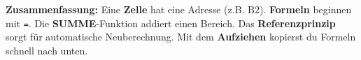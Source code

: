 \documentclass[11pt, a4paper]{article}
\begin{document}
\vspace{0.5em}


\begin{merkkasten}
\textbf{Zusammenfassung:} Eine \textbf{Zelle} hat eine Adresse (z.B. B2). \textbf{Formeln} beginnen mit \texttt{=}. Die \textbf{SUMME}-Funktion addiert einen Bereich. Das \textbf{Referenzprinzip} sorgt für automatische Neuberechnung. Mit dem \textbf{Aufziehen} kopierst du Formeln schnell nach unten.
\end{merkkasten}
\end{document}
